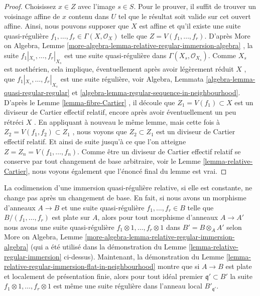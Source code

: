 \begin{proof}
Choisissez  $x \in Z$  avec l'image  $s \in S$. Pour le prouver, il suffit de
trouver un voisinage affine de  $x$  contenu dans  $U$  tel que le
résultat soit valide sur cet ouvert affine. Ainsi, nous pouvons supposer que
 $X$  est affine et qu'il existe une suite quasi-régulière  $f_1, \ldots, f_r \in \Gamma(X, \mathcal{O}_X)$ 
telle que  $Z = V(f_1, \ldots, f_r)$. D'après More on Algebra, Lemme  \ref{more-algebra-lemma-relative-regular-immersion-algebra} , la suite
 $f_1|_{X_s}, \ldots, f_r|_{X_s}$  est une suite quasi-régulière dans  $\Gamma(X_s, \mathcal{O}_{X_s})$. Comme  $X_s$ 
est noethérien, cela implique, éventuellement après avoir légèrement réduit
 $X$ , que  $f_1|_{X_s}, \ldots, f_r|_{X_s}$  est une suite régulière, voir Algebra, Lemmata
 \ref{algebra-lemma-quasi-regular-regular}  et  \ref{algebra-lemma-regular-sequence-in-neighbourhood}. D'après le Lemme  \ref{lemma-fibre-Cartier} , il découle que
 $Z_1 = V(f_1) \subset X$  est un diviseur de Cartier effectif relatif, encore après avoir
éventuellement un peu rétréci  $X$ . En appliquant à nouveau le même lemme,
mais cette fois à  $Z_2 = V(f_1, f_2) \subset Z_1$ , nous voyons que  $Z_2 \subset Z_1$  est un diviseur de
Cartier effectif relatif. Et ainsi de suite jusqu'à ce que l'on atteigne
 $Z = Z_n = V(f_1, \ldots, f_n)$. Comme être un diviseur de Cartier effectif relatif se conserve par
tout changement de base arbitraire, voir le Lemme  \ref{lemma-relative-Cartier}, nous voyons
également que l'énoncé final du lemme est vrai.
\end{proof}

\begin{remark}
\label{remark-relative-regular-immersion-elements}
La codimension d'une immersion quasi-régulière relative, si elle est constante, ne
change pas après un changement de base. En fait, si nous avons un morphisme
d'anneaux  $A \to B$  et une suite quasi-régulière  $f_1, \ldots, f_r \in B$  telle que
 $B/(f_1, \ldots, f_r)$  est plate sur  $A$, alors pour tout morphisme d'anneaux
 $A \to A'$  nous avons une suite quasi-régulière  $f_1 \otimes 1, \ldots, f_r \otimes 1$  dans  $B' = B \otimes_A A'$ 
selon More on Algebra, Lemme  \ref{more-algebra-lemma-relative-regular-immersion-algebra}  (qui a été utilisé dans la démonstration
du Lemme  \ref{lemma-relative-regular-immersion}  ci-dessus). Maintenant, la démonstration du Lemme
 \ref{lemma-relative-regular-immersion-flat-in-neighbourhood}  montre que si  $A \to B$  est plate et localement de présentation
finie, alors pour tout idéal premier  $\mathfrak q' \subset B'$  la suite  $f_1 \otimes 1, \ldots, f_r \otimes 1$  est même
une suite régulière dans l'anneau local  $B'_{\mathfrak q'}$.
\end{remark}

